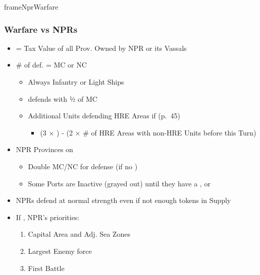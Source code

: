 \documentclass[10pt]{article}
\newlength{\fhNprWarfare} \setlength\fhNprWarfare{20\baselineskip}
\begin{document}
\begin{dynamiccontents*}{frameNprWarfare}\begin{eubox}{\fhNprWarfare}
	\subsubsection*{Warfare vs NPRs }
	\begin{itemize}
		\item {} = Tax Value of all Prov. Owned by NPR or its Vassals
		\item {}\# of def.  = MC or NC
		\begin{itemize}
			\item Always Infantry or Light Ships
			\item {} defends with ½ of MC
			\item Additional Units defending HRE Areas if  (p.~45)
			\begin{itemize}
				\item (3 × \authority) - (2 × \# of HRE Areas with non-HRE Units before this Turn)
			\end{itemize}
		\end{itemize}
		\item NPR Provinces on 
		\begin{itemize}
			\item Double MC/NC for defense (if no \plague)
			\item Some Ports are Inactive (grayed out) until they have a \dnpr, \town or \vassal
		\end{itemize}
		\item NPRs defend at normal strength even if not enough tokens in Supply
		\item If , NPR's priorities:
		\begin{enumerate}
			\item Capital Area and Adj. Sea Zones
			\item Largest Enemy force
			\item First Battle
		\end{enumerate}
	\end{itemize}
\end{eubox}\end{dynamiccontents*}
\end{document}
